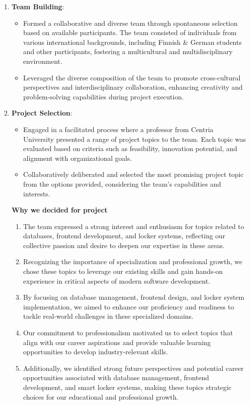 \begin{enumerate}
    \item \textbf{Team Building}:
    \begin{itemize}
        \item Formed a collaborative and diverse team through spontaneous selection based on available participants. The team consisted of individuals from various international backgrounds, including Finnish \& German students and other participants, fostering a multicultural and multidisciplinary environment.
        \item Leveraged the diverse composition of the team to promote cross-cultural perspectives and interdisciplinary collaboration, enhancing creativity and problem-solving capabilities during project execution.
    \end{itemize}
    
    \item \textbf{Project Selection}:
    \begin{itemize}
        \item Engaged in a facilitated process where a professor from Centria University presented a range of project topics to the team. Each topic was evaluated based on criteria such as feasibility, innovation potential, and alignment with organizational goals.
        \item Collaboratively deliberated and selected the most promising project topic from the options provided, considering the team's capabilities and interests.
    \end{itemize}
    \textbf{Why we decided for project}
    \begin{enumerate}
        \item The team expressed a strong interest and enthusiasm for topics related to databases, frontend development, and locker systems, reflecting our collective passion and desire to deepen our expertise in these areas.
        \item Recognizing the importance of specialization and professional growth, we chose these topics to leverage our existing skills and gain hands-on experience in critical aspects of modern software development.
        \item By focusing on database management, frontend design, and locker system implementation, we aimed to enhance our proficiency and readiness to tackle real-world challenges in these specialized domains.
        \item Our commitment to professionalism motivated us to select topics that align with our career aspirations and provide valuable learning opportunities to develop industry-relevant skills.
        \item Additionally, we identified strong future perspectives and potential career opportunities associated with database management, frontend development, and smart locker systems, making these topics strategic choices for our educational and professional growth.
    \end{enumerate}
    


\end{enumerate}

